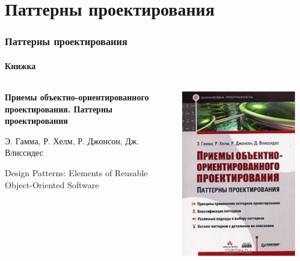 \documentclass[xetex,mathserif,serif]{beamer}
\begin{document}
	\section{Паттерны проектирования}

	\begin{frame}
		\frametitle{Паттерны проектирования}
		\framesubtitle{Книжка}
		\begin{columns}
			\begin{column}{0.7\textwidth}
				\textbf{Приемы объектно-ориентированного проектирования. Паттерны проектирования}
				
				Э. Гамма, Р. Хелм, Р. Джонсон, Дж. Влиссидес

				Design Patterns: Elements of Reusable Object-Oriented Software
			\end{column}
			\begin{column}{0.3\textwidth}
				\begin{center}
					\includegraphics[width=0.9\textwidth]{patternsBookCover.png}
				\end{center}
			\end{column}
		\end{columns}
	\end{frame}
\end{document}
